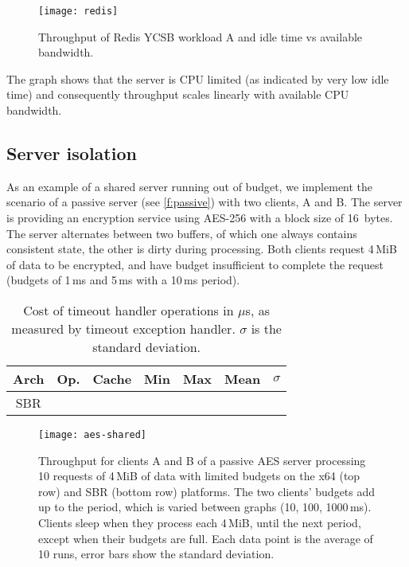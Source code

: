 \begin{figure}[t]
  \centering
  \texttt{[image: redis]}
  \caption{Throughput of Redis YCSB workload A and idle time vs available bandwidth.}
  \label{f:redis}
\end{figure}

The graph shows that the server is CPU limited (as indicated by very low idle time)
and consequently throughput scales linearly with available CPU
bandwidth.

\subsection{Server isolation} 

As an example of a shared server running out of budget, we implement
the scenario of a passive server (see \autoref{f:passive}) with two
clients, A and B. The server is providing an encryption service using AES-256
with a block size of 16~bytes. The server alternates between two
buffers, of which one always contains consistent state, the other is
dirty during processing. Both clients request 4\,MiB of data to be encrypted, and
have budget insufficient to complete the request (budgets of 1\,ms and
5\,ms with a 10\,ms period).

\begin{table}[t]\centering
\begin{tabular}{|c|l|l|r|r|r|r|}\hline
\textbf{Arch} & \textbf{Op.} & \textbf{Cache} & \textbf{Min} &
                          \textbf{Max} & \textbf{Mean} &
                          \multicolumn{1}{c|}{\boldmath \(\sigma\)} \\\hline
\multirow{8}{*}{SBR}  \hline
\multirow{8}{*}{x64}  \hline
\end{tabular}
\caption{Cost of timeout handler operations in \(\mu\)s, as measured
  by timeout exception handler. \(\sigma\) is the standard deviation.}
\label{t:rollback}
\end{table}

\begin{figure*}[t]
  \centering
  \texttt{[image: aes-shared]}
  \caption{Throughput for clients A and B of a passive AES server processing 10 requests of 4\,MiB of data with
      limited budgets on the x64 (top row) and SBR (bottom row) platforms. The two clients' budgets
      add up to the period, which is varied between graphs (10, 100, 1000\,ms). Clients sleep when
      they process each 4\,MiB, until the next period, except when their budgets are full. Each data point is the average of 10 runs, error bars show the standard deviation.}
  \label{f:aes}
\end{figure*}

